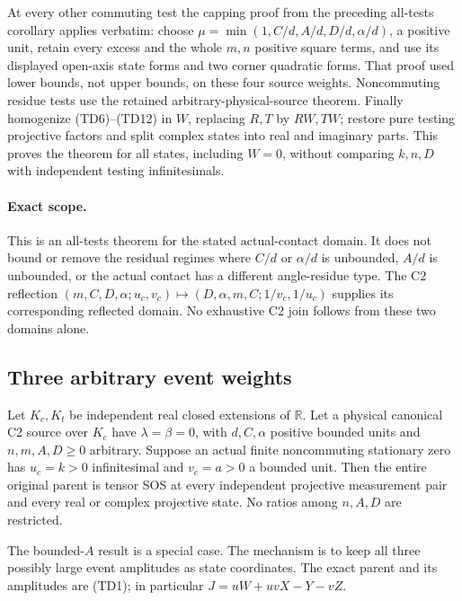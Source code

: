 At every other commuting test the capping proof from the preceding
all-tests corollary applies verbatim: choose
$\mu=\min(1,C/d,A/d,D/d,\alpha/d)$, a positive unit, retain every
excess and the whole $m,n$ positive square terms, and use its displayed open-axis
state forms and two corner quadratic forms. That proof used lower
bounds, not upper bounds, on these four source weights. Noncommuting
residue tests use the retained arbitrary-physical-source theorem.
Finally homogenize (TD6)--(TD12) in $W$, replacing $R,T$ by $RW,TW$;
restore pure testing projective factors and split complex states into
real and imaginary parts. This proves the theorem for all states,
including $W=0$, without comparing $k,n,D$ with independent testing
infinitesimals.

\paragraph{Exact scope.}
This is an all-tests theorem for the stated actual-contact domain.
It does not bound or remove the residual regimes where $C/d$ or
$\alpha/d$ is unbounded, $A/d$ is unbounded, or the actual contact
has a different angle-residue type. The C2 reflection
$(m,C,D,\alpha;u_c,v_c)\mapsto(D,\alpha,m,C;1/v_c,1/u_c)$ supplies
its corresponding reflected domain. No exhaustive C2 join follows
from these two domains alone.

\subsection{Three arbitrary event weights}
\label{component:p6c62a53b1454}

\label{p6c62a53b1454:sec:c2-three-large}

\begin{theorem}
\label{p6c62a53b1454:thm:c2-three-large}
Let $K_c,K_t$ be independent real closed extensions of $\mathbb R$.
Let a physical canonical C2 source over $K_c$ have $\lambda=\beta=0$,
with $d,C,\alpha$ positive bounded units and
$n,m,A,D\geq0$ arbitrary. Suppose an actual finite noncommuting
stationary zero has $u_c=k>0$ infinitesimal and $v_c=a>0$ a bounded
unit. Then the entire original parent is tensor SOS at every
independent projective measurement pair and every real or complex
projective state. No ratios among $n,A,D$ are restricted.
\end{theorem}

The bounded-$A$ result is a special case. The mechanism is to keep
all three possibly large event amplitudes as state coordinates.
The exact parent and its amplitudes are (TD1); in particular
$J=uW+uvX-Y-vZ$.

